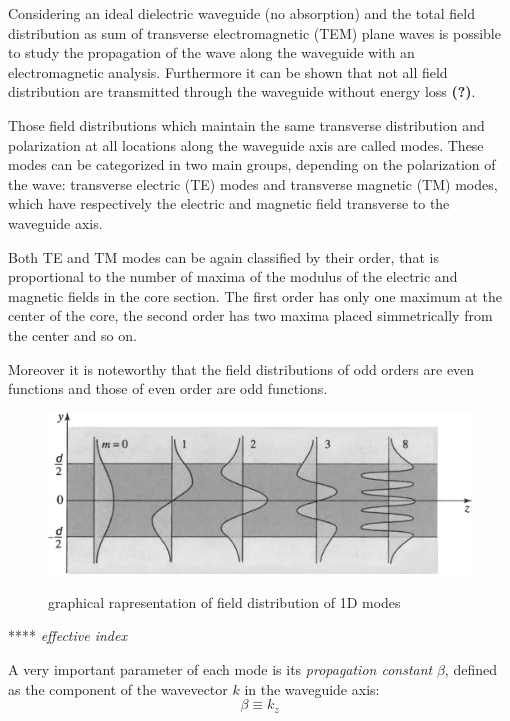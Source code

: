 \documentclass[12pt,a4paper,twoside]{article}
\begin{document}
Considering an ideal dielectric waveguide (no absorption) and the total field distribution as sum of transverse electromagnetic (TEM) plane waves is possible to study the propagation of the wave along the waveguide with an electromagnetic analysis.
Furthermore it can be shown that not all field distribution are transmitted through the waveguide without energy loss \textbf{(?)}.

Those field distributions which maintain the same transverse distribution and polarization at all locations along the waveguide axis are called modes.
These modes can be categorized in two main groups, depending on the polarization of the wave: transverse electric (TE) modes and transverse magnetic (TM) modes, which have respectively the electric and magnetic field transverse to the waveguide axis.

Both TE and TM modes can be again classified by their order, that is proportional to the number of maxima of the modulus of the electric and magnetic fields in the core section.
The first order has only one maximum at the center of the core, the second order has two maxima placed simmetrically from the center and so on.

Moreover it is noteworthy that the field distributions of odd orders are even functions and those of even order are odd functions.

\begin{figure}[ht]
	\centering
	\includegraphics[width=.75\textwidth]{1D_fields.png}
	\label{fig_1dmodes}
	\caption{graphical rapresentation of field distribution of 1D modes}
\end{figure}

\vspace{18pt}
****		\textit{effective index}
\vspace{12pt}

A very important parameter of each mode is its \textit{propagation constant} $\beta$, defined as the component of the wavevector $k$ in the waveguide axis:
\begin{equation}
\beta \equiv k_z
\end{equation}
\end{document}
